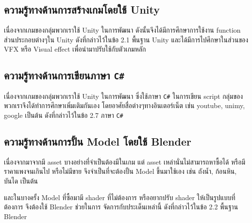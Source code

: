 \subsection{ความรู้ทางด้านการสร้างเกมโดยใช้ Unity}
\enskip \enskip \enskip เนื่องจากเกมของกลุ่มพวกเราใช้ Unity ในการพัฒนา ดังนั้นจึงได้มีการศึกษาการใช้งาน function ส่วนประกอบต่างๆใน
Unity ดังที่กล่าวไว้ในข้อ 2.1 พื้นฐาน Unity และได้มีการไปศึกษาในส่วนของ VFX หรือ Visual effect เพื่อนำมาปรับใช้กับตัวเกมหลัก  

\subsection{ความรู้ทางด้านการเขียนภาษา \texttt{C\#}}
\enskip \enskip \enskip เนื่องจากเกมของกลุ่มพวกเราใช้ Unity ในการพัฒนา ซึ่งใช้ภาษา \texttt{C\#} ในการเขียน script กลุ่มของพวกเราจึงได้ทำการศึกษาเพิ่มเติมกันเอง
โดยอาศัยสื่อต่างๆทางอินเตอร์เน็ต เช่น youtube, unimy, google เป็นต้น ดังที่กล่าวไว้ในข้อ 2.7 ภาษา \texttt{C\#}

\subsection{ความรู้ทางด้านการปั้น Model โดยใช้ Blender}
\enskip \enskip \enskip เนื่องจากมาจากมี asset บางอย่างที่จำเป็นต้องมีในเกม แต่ asset เหล่านั่นไม่สามารถหาซื้อได้ หรือมีราคาแพงจนเกินไป หรือไม่มีขาย 
จึงจำเป็นที่จะต้องปั้น Model ขึ้นมาใช้เอง เช่น ถังน้ำ, ก้อนหิน, บันได เป็นต้น

\enskip \enskip \enskip และในบางครั้ง Model ที่ซื้อมามี shader ที่ไม่ต้องการ หรืออยากปรับ shader ให้เป็นรูปแบบที่ต้องการ จึงต้องใช้ Blender ช่วยในการ
จัดการกับประเด็นเหล่านี้ ดังที่กล่าวไว้ในข้อ 2.2 พื้นฐาน Blender



